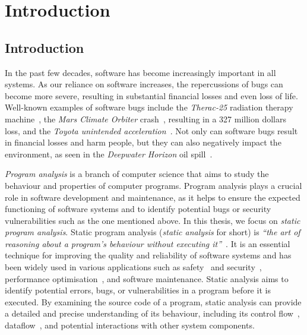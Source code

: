 \chapter{Introduction}
\section{Introduction}
In the past few decades, software has become increasingly important in all systems.
As our reliance on software increases, the repercussions of bugs can become more severe,
resulting in substantial financial losses and even loss of life.
Well-known examples of software bugs include the \emph{Therac-25} radiation therapy machine~\cite{leveson1993investigation},
the \emph{Mars Climate Orbiter} crash~\cite{Sawyer1999}, resulting in a 327 million dollars loss, and the \emph{Toyota unintended acceleration}~\cite{kane2010toyota}.
Not only can software bugs result in financial losses and harm people, but they can also negatively impact the environment,
as seen in the \emph{Deepwater Horizon} oil spill~\cite{Shafer2010Oil}.

\emph{Program analysis} is a branch of computer science that aims to study the behaviour
and properties of computer programs. Program analysis plays a crucial role in software
development and maintenance, as it helps to ensure the expected functioning of software
systems and to identify potential bugs or security vulnerabilities such as the one mentioned above.
In this thesis, we focus on \emph{static program analysis}.
Static program analysis (\emph{static analysis} for short) is
\emph{``the art of reasoning about a program's behaviour without executing it''}~\cite{spa}.
It is an essential technique for improving the quality and reliability of software
systems and has been widely used in various applications such
as safety~\cite{cousot2005astree,Blanchet2002} and security~\cite{piskachev2021secucheck,flowDroid,ayewah2008using,Sayar_2022,fink2012wala},
performance optimisation~\cite{aho2007compilers,appel2004modern}, and software maintenance.
Static analysis aims to identify potential errors, bugs, or vulnerabilities
in a program before it is executed.
By examining the source code of a program, static
analysis can provide a detailed and precise understanding of its behaviour, including
its control flow~\cite{allen1970control}, dataflow~\cite{kam1977monotone},
and potential interactions with other system components.



